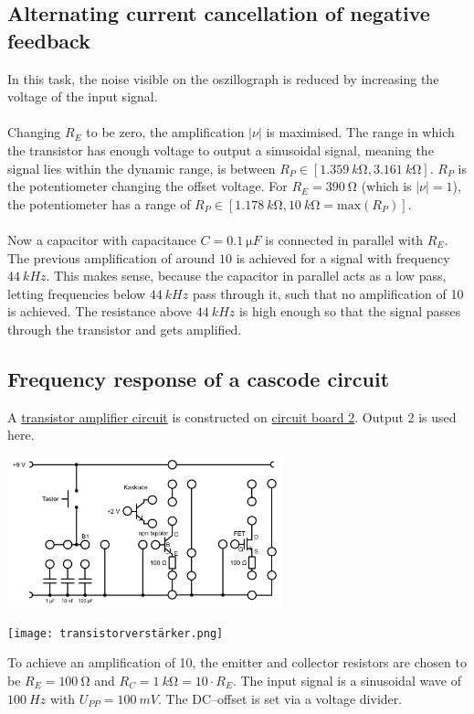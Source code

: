 \documentclass[a4paper,10pt]{article}
\newenvironment{Figure}
  {\par\medskip\noindent\minipage{\linewidth}}
  {\endminipage\par\medskip} %
\numberwithin{equation}{section}
\begin{document}
\begin{multicols}{2}
	\subsection{Alternating current cancellation of negative feedback}
	In this task, the noise visible on the oszillograph is reduced by increasing the voltage of the input signal.
	\\\\Changing $R_E$ to be zero, the amplification $|\nu |$ is maximised.
	The range in which the transistor has enough voltage to output a sinusoidal signal, meaning the signal lies within the dynamic range, is between $R_P  \in  \left[\SI{1.359}{k\ohm},\SI{3.161}{k\ohm}\right]$.
	$R_P$ is the potentiometer changing the offset voltage.
	For $R_E=\SI{390}{\ohm}$ (which is $|\nu |=1$), the potentiometer has a range of $R_P  \in  \left[\SI{1.178}{k\ohm},\SI{10}{k\ohm}=\text{max}\left(R_P\right)\right]$.
	\\\\Now a capacitor with capacitance $C=\SI{0.1}{\micro F}$ is connected in parallel with $R_E$.
	The previous amplification of around $10$ is achieved for a signal with frequency $\SI{44}{kHz}$.
	This makes sense, because the capacitor in parallel acts as a low pass, letting frequencies below $\SI{44}{kHz}$ pass through it, such that no amplification of 10 is achieved.
	The resistance above $\SI{44}{kHz}$ is high enough so that the signal passes through the transistor and gets amplified.

	\subsection{Frequency response of a cascode circuit}
	A \hyperref[fig:transistorverstärker]{transistor amplifier circuit} is constructed on \hyperref[fig:schaltbrett_2]{circuit board 2}.
	Output 2 is used here.
	\begin{Figure}
		\centering
		\includegraphics[width=0.6\textwidth]{schaltbrett_2.png}
		 \label{fig:schaltbrett_2}
	\end{Figure}
	\begin{Figure}
		\centering
		\texttt{[image: transistorverstärker.png]}
		 \label{fig:transistorverstärker}
	\end{Figure}
	To achieve an amplification of 10, the emitter and collector resistors are chosen to be $R_E=\SI{100}{\ohm}$ and $R_C=\SI{1}{k\ohm}=10\cdot R_E$.
	The input signal is a sinusoidal wave of $\SI{100}{Hz}$ with $U_{PP}=\SI{100}{mV}$.
	The DC--offset is set via a voltage divider.

\end{multicols}

\clearpage
\listoffigures
\listoftables



\end{document}
